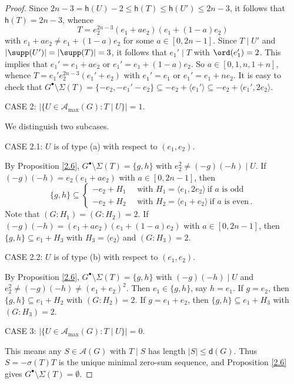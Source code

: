 \documentclass[a4paper, 10pt]{amsart}
\theoremstyle{plain}
\theoremstyle{definition}
\numberwithin{equation}{section}
\begin{document}
\begin{proof}
	Since $2n - 3= \mathsf h(U)-2\le \mathsf h(T) \le \mathsf h(U')\le 2n-3$, it follows that   $\mathsf h(T)=2n-3$, whence 
\[
T= e_2^{2n - 3}  (e_1 + a e_2)  (e_1 + (1 - a) e_2) 
\] 
with $e_1 + a e_2\ne e_1 + (1 - a) e_2$ for some $a \in [0,  2n - 1]$. 
	Since $T\mid U'$ and $|\supp (U')|=|\supp (T)|=3$, it follows that $e_1'\mid T$ with $\ord (e_1')=2$. This implies that $e_1'=e_1 + a e_2$ or $e_1'=e_1 + (1 - a) e_2$. So $a \in [0,1,n,1+n]$, whence $T= e_1'   e_2^{2n - 3}   (e_1' +  e_2)$ with $e_1'=e_1$ or $e_1'=e_1 + n e_2$. 
		It is easy to check that $G^{\bullet} \setminus \Sigma (T)=\{-e_2, -e_1'-e_2\} \subseteq -e_2+ \langle e_1' \rangle \subseteq -e_2+\langle e_1',2e_2 \rangle$.
	
\smallskip
\noindent
CASE 2:  $|\{U \in \mathcal A_{\max}(G) \colon T \mid U \}|=1$.

We distinguish two subcases.
	

\smallskip
\noindent
CASE 2.1: $U$ is of type (a) with respect to $(e_1, e_2)$. 


By Proposition \ref{2.6}, $G^{\bullet} \setminus \Sigma (T)=\{g,h\}$ with $e_2^2\ne (-g)(-h)\mid U$. If $(-g)(-h)=e_2 (e_1 + a e_2)$ with $a \in [0,  2n - 1]$, then 
\[
\{g,h\} \subseteq 
\begin{cases} 
-e_2+ H_1 \quad \text{ with } H_1= \langle e_1,2e_2 \rangle \ \text{if $a $ is odd} \\
-e_2+ H_2 \quad \text{ with } H_2= \langle e_1+e_2 \rangle \ \text{if    $a $ is even} \,.
\end{cases}
\]
Note that $(G : H_1) = (G : H_2) = 2$.
	If $(-g)(-h)=(e_1 + a e_2)  (e_1 + (1 - a) e_2)$ with $a \in [0,  2n - 1]$, then $\{g,h\}\subseteq e_1+ H_3$ with $H_3= \langle e_2 \rangle$ and $(G \colon H_3)=2$.
	
\smallskip
\noindent
CASE 2.2: $U$ is of type (b) with respect to $(e_1, e_2)$. 

By Proposition \ref{2.6}, $G^{\bullet} \setminus \Sigma (T)=\{g,h\}$ with $ (-g)(-h)\mid U$ and $e_2^2\ne (-g)(-h) \ne (e_1+ e_2)^2$. Then $e_1\in \{g,h\}$,  say $h=e_1$. If $g=e_2$, then $\{g,h\}\subseteq e_1+ H_2$ with  $(G \colon H_2)=2$. If $g=e_1+ e_2$, then $\{g,h\}\subseteq e_1+ H_3$ with  $(G \colon H_3)=2$.

CASE 3:  $|\{U \in \mathcal A_{\max}(G) \colon T \mid U \}|=0$. 

This means any $S\in \mathcal A(G)$ with $T\mid S$ has length $|S|\le \mathsf d (G)$. Thus $S=-\sigma(T)T$ is the unique minimal zero-sum sequence, and Proposition \ref{2.6} gives $G^{\bullet} \setminus \Sigma (T)= \emptyset$.
\end{proof}
\end{document}

